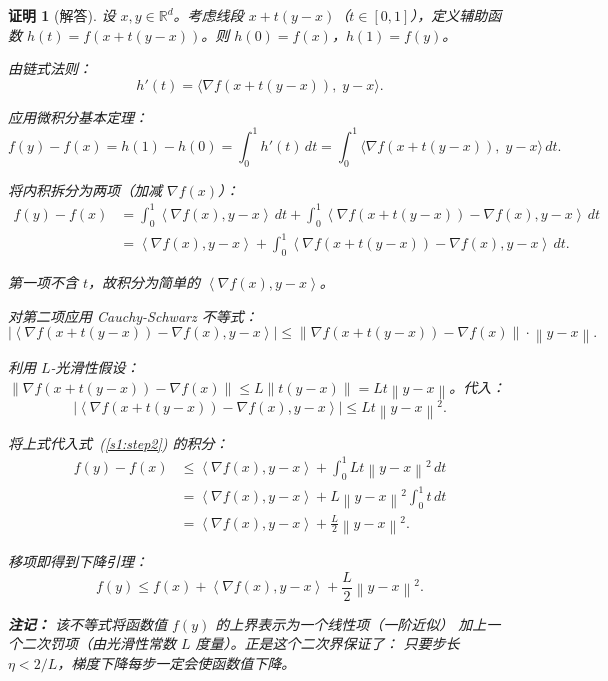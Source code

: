 \documentclass[12pt,a4paper]{ctexart}
\theoremstyle{definition}
\theoremstyle{plain}
\newtheorem*{proof*}{证明}
\newcommand{\R}{\mathbb{R}}
\newcommand{\grad}{\nabla}
\newcommand{\norm}[1]{\left\lVert #1 \right\rVert}
\newcommand{\ip}[2]{\left\langle #1,#2 \right\rangle}
\begin{document}
\begin{proof*}[解答]
设 $x, y \in \R^d$。考虑线段 $x + t(y-x)$（$t \in [0,1]$），定义辅助函数
$h(t) = f(x + t(y-x))$。则 $h(0) = f(x)$，$h(1) = f(y)$。

由链式法则：
\begin{equation}
  h'(t) = \big\langle \grad f(x + t(y-x)),\; y - x \big\rangle.
\end{equation}

应用微积分基本定理：
\begin{equation}\label{s1:step1}
  f(y) - f(x) = h(1) - h(0)
  = \int_{0}^{1} h'(t)\,dt
  = \int_{0}^{1} \big\langle \grad f(x + t(y-x)),\; y - x \big\rangle\,dt.
\end{equation}

将内积拆分为两项（加减 $\grad f(x)$）：
\begin{equation}\label{s1:step2}
  \begin{aligned}
    f(y) - f(x)
    &= \int_{0}^{1} \ip{\grad f(x)}{y-x}\,dt
       + \int_{0}^{1} \ip{\grad f(x + t(y-x)) - \grad f(x)}{y-x}\,dt \\[4pt]
    &= \ip{\grad f(x)}{y-x}
       + \int_{0}^{1} \ip{\grad f(x + t(y-x)) - \grad f(x)}{y-x}\,dt.
  \end{aligned}
\end{equation}

第一项不含 $t$，故积分为简单的 $\ip{\grad f(x)}{y-x}$。

对第二项应用 Cauchy-Schwarz 不等式：
\begin{equation}\label{s1:step3}
  \big|\ip{\grad f(x + t(y-x)) - \grad f(x)}{y-x}\big|
  \le \norm{\grad f(x + t(y-x)) - \grad f(x)} \cdot \norm{y-x}.
\end{equation}

利用 $L$-光滑性假设：$\norm{\grad f(x + t(y-x)) - \grad f(x)} \le L \norm{t(y-x)} = L t \norm{y-x}$。代入：
\begin{equation}\label{s1:step4}
  \big|\ip{\grad f(x + t(y-x)) - \grad f(x)}{y-x}\big|
  \le L t \norm{y-x}^2.
\end{equation}

将上式代入式~(\ref{s1:step2}) 的积分：
\begin{equation}\label{s1:step5}
  \begin{aligned}
    f(y) - f(x)
    &\le \ip{\grad f(x)}{y-x}
       + \int_{0}^{1} L t \norm{y-x}^2\,dt \\[4pt]
    &= \ip{\grad f(x)}{y-x}
       + L \norm{y-x}^2 \int_{0}^{1} t\,dt \\[4pt]
    &= \ip{\grad f(x)}{y-x} + \frac{L}{2}\norm{y-x}^2.
  \end{aligned}
\end{equation}

移项即得到下降引理：
\begin{equation}
  \boxed{f(y) \le f(x) + \ip{\grad f(x)}{y-x} + \frac{L}{2}\norm{y-x}^2.}
\end{equation}

\textbf{注记：} 该不等式将函数值 $f(y)$ 的上界表示为一个线性项（一阶近似）
加上一个二次罚项（由光滑性常数 $L$ 度量）。正是这个二次界保证了：
只要步长 $\eta < 2/L$，梯度下降每步一定会使函数值下降。

\end{proof*}
\end{document}

